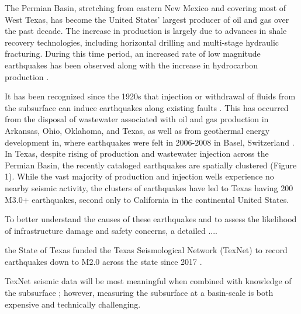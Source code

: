 \documentclass{utexasthesis}
\begin{document}
The Permian Basin, stretching from eastern New Mexico and covering most of West Texas, has become the United States' largest producer of oil and gas over the past decade. The increase in production is largely due to advances in shale recovery technologies, including horizontal drilling and multi-stage hydraulic fracturing.
During this time period, an increased rate of low magnitude earthquakes has been observed along with the increase in hydrocarbon production
\citep{Frohlich2016HistoricalReviewInduced, Atkinson2016HydraulicFracturingSeismicity, Frohlich2019OnsetCauseIncreased, Lomax2019ImprovingAbsoluteEarthquake, Savvaidis2020InducedSeismicityDelaware, Skoumal2020InducedSeismicityDelaware}.

It has been recognized since the 1920s that injection or withdrawal of fluids from the subsurface can induce earthquakes along existing faults \citep{Council2013InducedSeismicityPotential, Simpson1988TwoTypesReservoir, Ellsworth2013InjectionInducedEarthquakes}.  
This has occurred from the disposal of wastewater associated with oil and gas production in Arkansas, Ohio, Oklahoma, and Texas, as well as from geothermal energy development in, where earthquakes were felt in 2006-2008 in Basel, Switzerland \cite{Deichmann2009EarthquakesInducedStimulation}.
In Texas, despite rising of production and wastewater injection across the Permian Basin, the recently cataloged earthquakes are spatially clustered (Figure 1). While the vast majority of production and injection wells experience no nearby seismic activity, the clusters of earthquakes have led to Texas having 200 M3.0+ earthquakes, second only to California in the continental United States.





To better understand the causes of these earthquakes and to assess the likelihood of infrastructure damage and safety concerns, a detailed ....

the State of Texas funded the Texas Seismological Network (TexNet) to record earthquakes down to M2.0 across the state since 2017 \citep{Savvaidis2019TexnetStatewideSeismological}. 

TexNet seismic data will be most meaningful when combined with knowledge of the subsurface \citep{Council2013InducedSeismicityPotential, TheAcademyofMedicine2017EnvironmentalCommunityImpacts}; however, measuring the subsurface at a basin-scale is both expensive and technically challenging.
 
\end{document}
